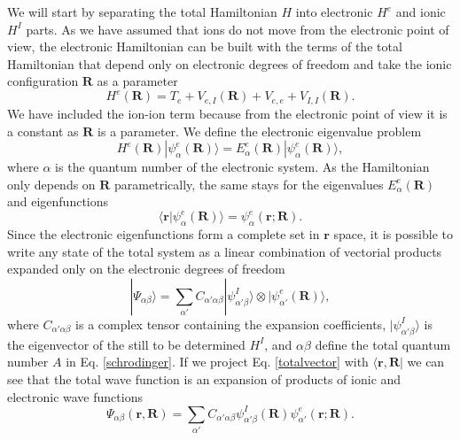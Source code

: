 We will start by separating the total Hamiltonian $H$ into electronic $H^{e}$ and ionic $H^{I}$ parts. As we have assumed that ions do not move from the electronic point of view, the electronic Hamiltonian can be 
built with the terms of the total Hamiltonian that depend only on electronic degrees of freedom and take the ionic configuration $\mathbf{R}$ as a parameter
\begin{equation}
\label{electronic-harmiltonian}
H^{e}(\mathbf{R})=T_{e}+V_{e,I}(\mathbf{R})+V_{e,e}+V_{I,I}(\mathbf{R}).
\end{equation}
We have included the ion-ion term because from the electronic point of view it is a constant as $\mathbf{R}$ is a parameter. We define the electronic eigenvalue problem
\begin{equation}
 H^{e}(\mathbf{R})|\psi_{\alpha}^{e}(\mathbf{R})\rangle=E_{\alpha}^{e}(\mathbf{R})|\psi_{\alpha}^{e}(\mathbf{R})\rangle,
\end{equation}
where $\alpha$ is the quantum number of the electronic system. As the Hamiltonian only depends on $\mathbf{R}$ parametrically, the same stays for the eigenvalues $E_{\alpha}^{e}(\mathbf{R})$ and eigenfunctions
\begin{equation}
 \langle\mathbf{r}|\psi_{\alpha}^{e}(\mathbf{R})\rangle=\psi_{\alpha}^{e}(\mathbf{r};\mathbf{R}).
\end{equation}
Since the electronic eigenfunctions form a complete set in $\mathbf{r}$ space, it is possible to write any state of the total system as a linear combination of vectorial products expanded only on the electronic degrees of freedom
\begin{equation}
\label{totalvector}
 |\Psi_{\alpha\beta}\rangle=\sum_{\alpha'}C_{\alpha'\alpha\beta}|\psi_{\alpha'\beta}^{I}\rangle\otimes|\psi_{\alpha'}^{e}(\mathbf{R})\rangle,
\end{equation}
where $C_{\alpha'\alpha\beta}$ is a complex tensor containing the expansion coefficients, $|\psi_{\alpha'\beta}^{I}\rangle$ is the eigenvector of the still to be determined $H^{I}$, and $\alpha\beta$ define the total quantum 
number $A$ in Eq. \ref{schrodinger}. If we project Eq. \ref{totalvector} with $\langle\mathbf{r},\mathbf{R}|$ we can see that the total wave function is an expansion of products of ionic and electronic wave functions
\begin{equation}
 \Psi_{\alpha\beta}(\mathbf{r},\mathbf{R})=\sum_{\alpha'}C_{\alpha'\alpha\beta}\psi_{\alpha'\beta}^{I}(\mathbf{R})\psi_{\alpha'}^{e}(\mathbf{r};\mathbf{R}).
\end{equation}
